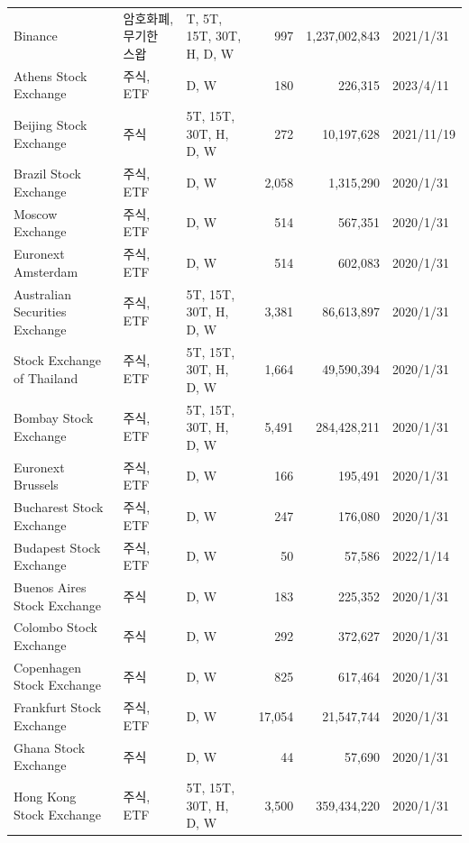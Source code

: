 \begin{footnotesize}
\begin{center}
\begin{longtable}{@{\extracolsep{\fill}} l l l r r l @{}}
    Binance            & 암호화폐,무기한 스왑             & T, 5T, 15T, 30T, H, D, W        & 997   & 1,237,002,843   & 2021/1/31 \\
        Athens Stock Exchange          & 주식, ETF             & D, W        & 180   & 226,315   & 2023/4/11 \\
        Beijing Stock Exchange         & 주식       & 5T, 15T, 30T, H, D, W & 272      & 10,197,628   & 2021/11/19 \\
        Brazil Stock Exchange          & 주식, ETF       & D, W & 2,058      & 1,315,290   & 2020/1/31 \\
        Moscow Exchange             & 주식, ETF       & D, W              & 514     &  567,351    & 2020/1/31 \\
        Euronext Amsterdam             & 주식, ETF           & D, W                  & 514    & 602,083    & 2020/1/31 \\
        Australian Securities Exchange     & 주식, ETF           & 5T, 15T, 30T, H, D, W              & 3,381    & 86,613,897    & 2020/1/31 \\
        Stock Exchange of Thailand            & 주식, ETF        & 5T, 15T, 30T, H, D, W                  & 1,664   & 49,590,394    & 2020/1/31 \\
        Bombay Stock Exchange & 주식, ETF       & 5T, 15T, 30T, H, D, W              & 5,491 & 284,428,211 & 2020/1/31 \\
        Euronext Brussels & 주식, ETF       & D, W              & 166 & 195,491 & 2020/1/31 \\
        Bucharest Stock Exchange & 주식, ETF       & D, W  & 247 & 176,080 & 2020/1/31 \\
        Budapest Stock Exchange & 주식, ETF       & D, W  & 50 & 57,586 & 2022/1/14 \\
        Buenos Aires Stock Exchange & 주식 & D, W  & 183 & 225,352 & 2020/1/31 \\
        Colombo Stock Exchange & 주식 & D, W  & 292 & 372,627 &  2020/1/31 \\
        Copenhagen Stock Exchange & 주식 & D, W  & 825 & 617,464 & 2020/1/31 \\
        Frankfurt Stock Exchange & 주식, ETF & D, W  & 17,054 & 21,547,744 & 2020/1/31 \\
        Ghana Stock Exchange &  주식 & D, W  & 44 & 57,690 & 2020/1/31 \\
        Hong Kong Stock Exchange & 주식, ETF & 5T, 15T, 30T, H, D, W & 3,500 & 359,434,220  & 2020/1/31 \\

\end{longtable}
\end{center}
\end{footnotesize}
